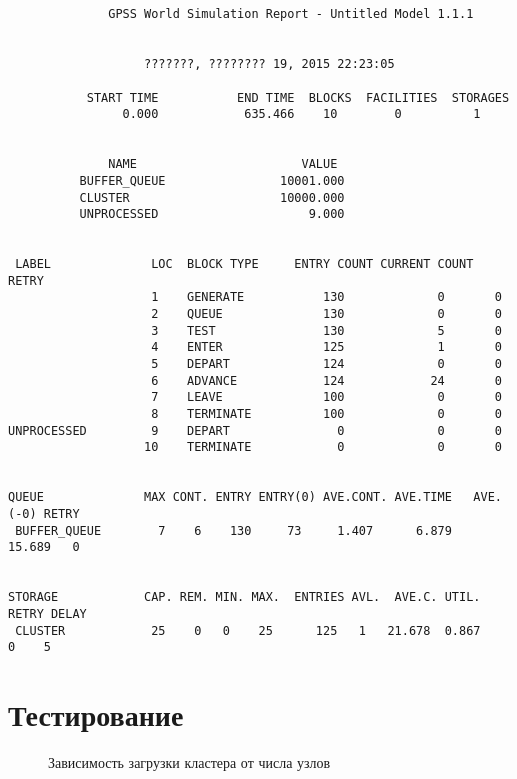 \documentclass[12pt,a4paper,oneside]{extarticle}
\begin{document}
        \begin{lstlisting}


              GPSS World Simulation Report - Untitled Model 1.1.1


                   ???????, ???????? 19, 2015 22:23:05  

           START TIME           END TIME  BLOCKS  FACILITIES  STORAGES
                0.000            635.466    10        0          1


              NAME                       VALUE  
          BUFFER_QUEUE                10001.000
          CLUSTER                     10000.000
          UNPROCESSED                     9.000


 LABEL              LOC  BLOCK TYPE     ENTRY COUNT CURRENT COUNT RETRY
                    1    GENERATE           130             0       0
                    2    QUEUE              130             0       0
                    3    TEST               130             5       0
                    4    ENTER              125             1       0
                    5    DEPART             124             0       0
                    6    ADVANCE            124            24       0
                    7    LEAVE              100             0       0
                    8    TERMINATE          100             0       0
UNPROCESSED         9    DEPART               0             0       0
                   10    TERMINATE            0             0       0


QUEUE              MAX CONT. ENTRY ENTRY(0) AVE.CONT. AVE.TIME   AVE.(-0) RETRY
 BUFFER_QUEUE        7    6    130     73     1.407      6.879     15.689   0


STORAGE            CAP. REM. MIN. MAX.  ENTRIES AVL.  AVE.C. UTIL. RETRY DELAY
 CLUSTER            25    0   0    25      125   1   21.678  0.867    0    5
   \end{lstlisting}

\section{Тестирование}
\label{sec:test}
        \begin{figure}[h!]        
        \centering
        \caption{Зависимость загрузки кластера от числа узлов}
        \label{pic:test}
        \end{figure}
\end{document}
